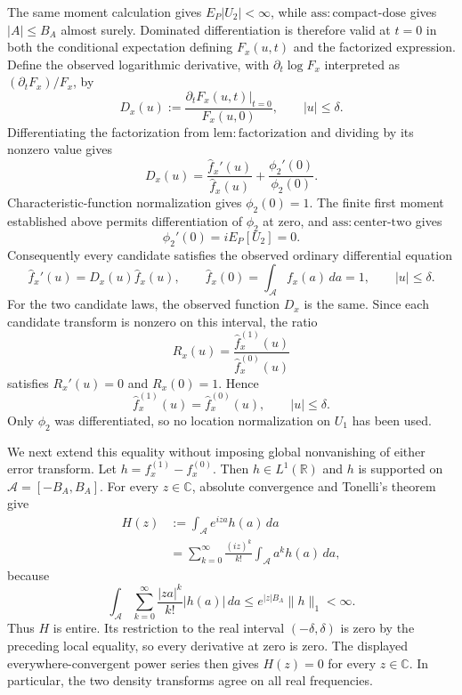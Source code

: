 The same moment calculation gives \(E_P|U_2|<\infty\), while \(\mathrm{ass{:}compact\text{-}dose}\) gives \(|A|\le B_A\) almost surely. Dominated differentiation is therefore valid at \(t=0\) in both the conditional expectation defining \(F_x(u,t)\) and the factorized expression. Define the observed logarithmic derivative, with \(\partial_t\log F_x\) interpreted as \((\partial_tF_x)/F_x\), by
\[
 D_x(u):=
 \frac{\left.\partial_tF_x(u,t)\right|_{t=0}}{F_x(u,0)},
 \qquad |u|\le\delta.
\]
Differentiating the factorization from \(\mathrm{lem{:}factorization}\) and dividing by its nonzero value gives
\[
 D_x(u)
 =\frac{\widehat f_x'(u)}{\widehat f_x(u)}
  +\frac{\phi_2'(0)}{\phi_2(0)}.
\]
Characteristic-function normalization gives \(\phi_2(0)=1\). The finite first moment established above permits differentiation of \(\phi_2\) at zero, and \(\mathrm{ass{:}center\text{-}two}\) gives
\[
 \phi_2'(0)=iE_P[U_2]=0.
\]
Consequently every candidate satisfies the observed ordinary differential equation
\[
 \widehat f_x'(u)=D_x(u)\widehat f_x(u),
 \qquad \widehat f_x(0)=\int_{\mathcal A}f_x(a)\,da=1,
 \qquad |u|\le\delta.
\]
For the two candidate laws, the observed function \(D_x\) is the same. Since each candidate transform is nonzero on this interval, the ratio
\[
 R_x(u)=\frac{\widehat f_x^{(1)}(u)}{\widehat f_x^{(0)}(u)}
\]
satisfies \(R_x'(u)=0\) and \(R_x(0)=1\). Hence
\[
 \widehat f_x^{(1)}(u)=\widehat f_x^{(0)}(u),
 \qquad |u|\le\delta.
\]
Only \(\phi_2\) was differentiated, so no location normalization on \(U_1\) has been used.

We next extend this equality without imposing global nonvanishing of either error transform. Let \(h=f_x^{(1)}-f_x^{(0)}\). Then \(h\in L^1(\mathbb R)\) and \(h\) is supported on \(\mathcal A=[-B_A,B_A]\). For every \(z\in\mathbb C\), absolute convergence and Tonelli's theorem give
\[
\begin{aligned}
 H(z)
 &:=\int_{\mathcal A}e^{iza}h(a)\,da\\
 &=\sum_{k=0}^{\infty}\frac{(iz)^k}{k!}
       \int_{\mathcal A}a^kh(a)\,da,
\end{aligned}
\]
because
\[
 \int_{\mathcal A}\sum_{k=0}^{\infty}
 \frac{|za|^k}{k!}|h(a)|\,da
 \le e^{|z|B_A}\|h\|_1<\infty.
\]
Thus \(H\) is entire. Its restriction to the real interval \((-\delta,\delta)\) is zero by the preceding local equality, so every derivative at zero is zero. The displayed everywhere-convergent power series then gives \(H(z)=0\) for every \(z\in\mathbb C\). In particular, the two density transforms agree on all real frequencies.

